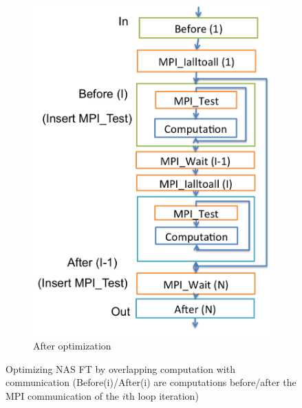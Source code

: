 \begin{figure}
\begin{subfigure}[b]{0.232\textwidth}
    \includegraphics[width=1\textwidth]{fig/ft_cco.png}
    \caption{After optimization}
    \label{fig:ft_cco}
  \end{subfigure}
  \caption{Optimizing NAS FT by
    overlapping computation with communication (Before(i)/After(i) are computations before/after the MPI communication of the $i$th loop iteration)}
\label{fig:ft}
\end{figure}

